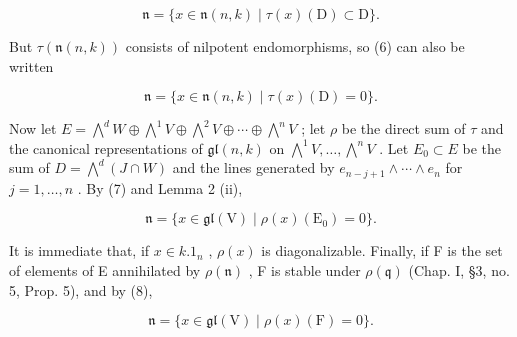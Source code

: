 \[
\mathfrak {n} = \{x \in \mathfrak {n} (n, k) \mid \tau (x) (\mathrm{D}) \subset \mathrm{D} \}.\tag{6}
\]

But \(\tau (\mathfrak{n}(n,k))\) consists of nilpotent endomorphisms, so (6) can also be written

\[
\mathfrak {n} = \{x \in \mathfrak {n} (n, k) \mid \tau (x) (\mathrm{D}) = 0 \}.\tag{7}
\]

Now let \(E = \bigwedge^{d} W \oplus \bigwedge^{1} V \oplus \bigwedge^{2} V \oplus \cdots \oplus \bigwedge^{n} V\) ; let \(\rho\) be the direct sum of \(\tau\) and the canonical representations of \(\mathfrak{gl}(n, k)\) on \(\bigwedge^{1} V, \ldots, \bigwedge^{n} V\) . Let \(E_{0} \subset E\) be the sum of \(D = \bigwedge^{d} (J \cap W)\) and the lines generated by \(e_{n-j+1} \wedge \cdots \wedge e_{n}\) for \(j = 1, \ldots, n\) . By (7) and Lemma 2 (ii),

\[
\mathfrak {n} = \{x \in \mathfrak {g l} (\mathrm{V}) \mid \rho (x) (\mathrm{E} _ {0}) = 0 \}.\tag{8}
\]

It is immediate that, if \(x \in k.1_{n}\) , \(\rho(x)\) is diagonalizable. Finally, if F is the set of elements of E annihilated by \(\rho(\mathfrak{n})\) , F is stable under \(\rho(\mathfrak{q})\) (Chap. I, §3, no. 5, Prop. 5), and by (8),

\[
\mathfrak {n} = \{x \in \mathfrak {g l} (\mathrm{V}) \mid \rho (x) (\mathrm{F}) = 0 \}.\tag{9}
\]

